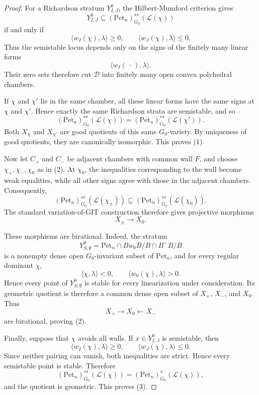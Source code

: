 \documentclass[12pt, reqno]{amsart}
\theoremstyle{plain}
\numberwithin{equation}{section}
\theoremstyle{definition}
\begin{document}
\begin{proof}
For a Richardson stratum \(Y^0_{I,J}\), the
Hilbert-Mumford criterion gives
\[
Y^0_{I,J}
\subseteq
(\mathrm{Pet}_n)^{ss}_{G_0}(\mathcal L(\chi))
\]
if and only if
\[
\langle w_I(\chi),\lambda\rangle\ge0,
\qquad
\langle w_J(\chi),\lambda\rangle\le0.
\]
Thus the semistable locus depends only on the signs of the finitely
many linear forms
\[
\langle w_I(\,\cdot\,),\lambda\rangle.
\]
Their zero sets therefore cut \(\mathcal D\) into finitely many open
convex polyhedral chambers.

If \(\chi\) and \(\chi'\) lie in the same chamber, all these linear
forms have the same signs at \(\chi\) and \(\chi'\). Hence exactly the
same Richardson strata are semistable, and so
\[
(\mathrm{Pet}_n)^{ss}_{G_0}(\mathcal L(\chi))
=
(\mathrm{Pet}_n)^{ss}_{G_0}(\mathcal L(\chi')).
\]
Both \(X_\chi\) and \(X_{\chi'}\) are good quotients of this same
\(G_0\)-variety. By uniqueness of good quotients, they are canonically
isomorphic. This proves (1).

Now let \(C_+\) and \(C_-\) be adjacent chambers with common wall
\(F\), and choose \(\chi_+,\chi_-,\chi_0\) as in (2). At \(\chi_0\),
the inequalities corresponding to the wall become weak equalities,
while all other signs agree with those in the adjacent chambers.
Consequently,
\[
(\mathrm{Pet}_n)^{ss}_{G_0}(\mathcal L(\chi_\pm))
\subseteq
(\mathrm{Pet}_n)^{ss}_{G_0}(\mathcal L(\chi_0)).
\]
The standard variation-of-GIT construction
\cite{DH,Thaddeus} therefore gives projective morphisms
\[
X_\pm\longrightarrow X_0.
\]

These morphisms are birational. Indeed, the stratum
\[
Y^0_{S,\emptyset}
=
\mathrm{Pet}_n\cap Bw_0B/B\cap B^-B/B
\]
is a nonempty dense open \(G_0\)-invariant subset of
\(\mathrm{Pet}_n\), and for every regular dominant \(\chi\),
\[
\langle\chi,\lambda\rangle<0,
\qquad
\langle w_0(\chi),\lambda\rangle>0.
\]
Hence every point of \(Y^0_{S,\emptyset}\) is stable for every
linearization under consideration. Its geometric quotient is therefore
a common dense open subset of \(X_+\), \(X_-\), and \(X_0\).
Thus
\[
X_+\longrightarrow X_0
\longleftarrow X_-
\]
are birational, proving (2).

Finally, suppose that \(\chi\) avoids all walls. If
\(x\in Y^0_{I,J}\) is semistable, then
\[
\langle w_I(\chi),\lambda\rangle\ge0,
\qquad
\langle w_J(\chi),\lambda\rangle\le0.
\]
Since neither pairing can vanish, both inequalities are strict.
Hence every semistable point is stable. Therefore
\[
(\mathrm{Pet}_n)^{ss}_{G_0}(\mathcal L(\chi))
=
(\mathrm{Pet}_n)^s_{G_0}(\mathcal L(\chi)),
\]
and the quotient is geometric. This proves (3).
\end{proof}
\end{document}
